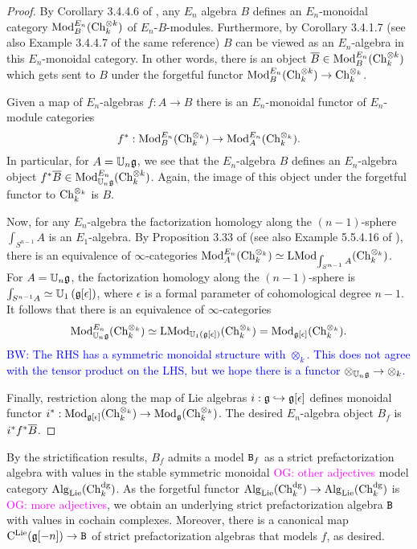 \documentclass[11pt]{amsart}
\numberwithin{equation}{section}
\def\brian{\textcolor{blue}{BW: }\textcolor{blue}}
\def\owen{\textcolor{magenta}{OG: }\textcolor{magenta}}
\begin{document}
\begin{proof}
By Corollary 3.4.4.6 of \cite{LurieHA}, any $E_n$ algebra $B$ defines an $E_n$-monoidal category ${\rm Mod}_B^{E_n} (\Ch_k^{\otimes k})$ of $E_n$-$B$-modules. 
Furthermore, by Corollary 3.4.1.7 \cite{LurieHA} (see also Example 3.4.4.7 of the same reference) $B$ can be viewed as an $E_n$-algebra in this $E_n$-monoidal category. 
In other words, there is an object $\Bar{B} \in  {\rm Mod}_B^{E_n} (\Ch_k^{\otimes k})$ which gets sent to $B$ under the forgetful functor ${\rm Mod}_B^{E_n} (\Ch_k^{\otimes k}) \to \Ch_k^{\otimes_k}$. 

Given a map of $E_n$-algebras $f : A \to B$ there is an $E_n$-monoidal functor of $E_n$-module categories 
\[
f^* :  {\rm Mod}_B^{E_n} (\Ch_k^{\otimes_k}) \to  {\rm Mod}_A^{E_n} (\Ch_k^{\otimes_k}) .
\]
In particular, for $A = \UU_n \fg$, we see that the $E_n$-algebra $B$ defines an $E_n$-algebra object $f^*\Bar{B} \in {\rm Mod}_{\UU_n \fg}^{E_n} (\Ch_k^{\otimes k})$. 
Again, the image of this object under the forgetful functor to $\Ch_k^{\otimes_k}$ is $B$. 

Now, for any $E_n$-algebra the factorization homology along the $(n-1)$-sphere $\int_{S^{n-1}} A$ is an $E_1$-algebra.
By Proposition 3.33 of \cite{FrancisHH} (see also Example 5.5.4.16 of \cite{LurieHA}), there is an equivalence of $\infty$-categories ${\rm Mod}^{E_n}_A (\Ch_k^{\otimes_k}) \simeq {\rm LMod}_{\int_{S^{n-1}} A} (\Ch_k^{\otimes_k})$.
For $A = \UU_n \fg$, the factorization homology along the $(n-1)$-sphere is $\int_{S^{n-1} A} \simeq \UU_1 \left(\fg[\epsilon] \right)$, where $\epsilon$ is a formal parameter of cohomological degree $n-1$.
It follows that there is an equivalence of $\infty$-categories 
\[
{\rm Mod}_{\UU_n \fg}^{E_n} (\Ch_k^{\otimes_k}) \simeq {\rm LMod}_{\UU_1(\fg[\epsilon])} (\Ch_k^{\otimes_k}) = {\rm Mod}_{\fg[\epsilon]} (\Ch_k^{\otimes_k}) .
\]
\brian{The RHS has a symmetric monoidal structure with $\otimes_k$. 
This does not agree with the tensor product on the LHS, but we hope there is a functor $\otimes_{\UU_n \fg} \to \otimes_k$.}

Finally, restriction along the map of Lie algebras $i : \fg \hookrightarrow \fg[\epsilon]$ defines monoidal functor $i^* :  {\rm Mod}_{\fg[\epsilon]} (\Ch_k^{\otimes_k})  \to  {\rm Mod}_{\fg} (\Ch_k^{\otimes_k})$. 
The desired $E_n$-algebra object $B_f$ is $i^* f^* \Bar{B}$.
\end{proof}

By the strictification results, $B_f$ admits a model ${\tt B}_f$ as a strict prefactorization algebra with values in the stable symmetric monoidal \owen{other adjectives} model category $\Alg_\Lie(\Ch_k^{\rm dg})$.
As the forgetful functor $\Alg_\Lie(\Ch_k^{\rm dg}) \to \Alg_\Lie(\Ch_k^{\rm dg})$ is \owen{more adjectives},
we obtain an underlying strict prefactorization algebra ${\tt B}$ with values in cochain complexes.
Moreover, there is a canonical map $\cliel(\fg[-n]) \to {\tt B}$ of strict prefactorization algebras that models $f$, as desired.
\end{document}
